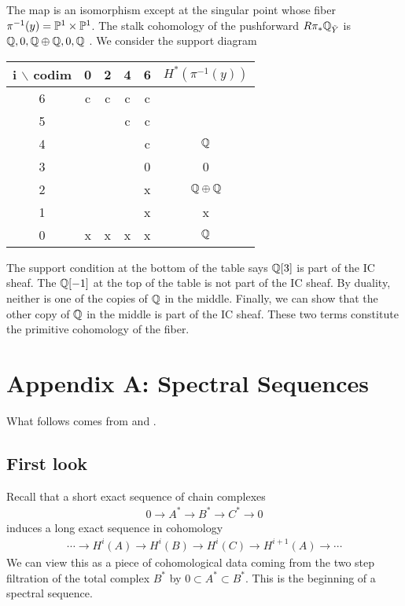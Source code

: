 \documentclass[12pt]{article}
\begin{document}
The map is an isomorphism except at the singular point whose fiber $\pi^{-1}(y) = \P^1\times 
\P^1$. The stalk cohomology of the pushforward $R\pi_*\Q_{\tilde Y}$ is $\Q,0,\Q\oplus\Q,0,\Q$ 
. We consider the support diagram 
\begin{center}
    \begin{tabular}{|c|c|c|c|c|c|}
        \hline
        i $\backslash$ codim & 0 & 2 & 4 & 6 & $H^*(\pi^{-1}(y))$ \\
        \hline
        6 & c & c & c & c & \\      
        \hline
        5 &  &  & c & c &  \\
        \hline
        4 &  & & & c & $\Q$ \\
        \hline
        3 &  &  &  & 0 & 0 \\
        \hline
        2 &  &  &  & x & $\Q\oplus\Q$ \\
        \hline
        1 &  &  &  & x & x \\
        \hline
        0 & x & x & x & x & $\Q$ \\
        \hline
    \end{tabular}
\end{center}
The support condition at the bottom of the table says $\Q[3]$ is part of the IC sheaf.
The $\Q[-1]$ at the top of the table is not part of the IC sheaf. By duality, neither is one of 
the copies of $\Q$ in the middle. Finally, we can show that the other copy of $\Q$ in the middle
is part of the IC sheaf. These two terms constitute the primitive cohomology of the fiber.





\section{Appendix A: Spectral Sequences}
What follows comes from \cite{griffiths-harris} and \cite{bott-tu}.
\subsection{First look}
Recall that a short exact sequence of chain complexes \begin{align*}
    0 \to A^* \to B^* \to C^* \to 0
\end{align*} induces a long exact sequence in cohomology \begin{align*}
    \cdots \to H^i(A) \to H^i(B) \to H^i(C) \to H^{i+1}(A) \to \cdots
\end{align*} We can view this as a piece of cohomological data coming from the 
two step filtration of the total complex $B^*$ by $0 \subset A^* \subset B^*$.
This is the beginning of a spectral sequence.
\end{document}
